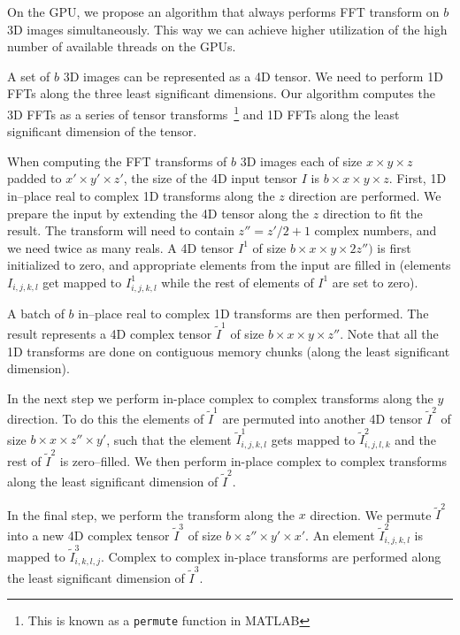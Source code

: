 \documentclass[conference]{IEEEtran}
\begin{document}
  On the GPU, we propose an algorithm that always performs FFT
  transform on $b$ 3D images simultaneously.  This way we can achieve
  higher utilization of the high number of available threads on the
  GPUs.

  A set of $b$ 3D images can be represented as a 4D tensor.  We need
  to perform 1D FFTs along the three least significant dimensions.
  Our algorithm computes the 3D FFTs as a series of tensor
  transforms~\footnote{This is known as a \texttt{permute} function in
    MATLAB} and 1D FFTs along the least significant dimension of the
  tensor.

  When computing the FFT transforms of $b$ 3D images each of size $x
  \times y \times z$ padded to $x' \times y' \times z'$, the size of
  the 4D input tensor $I$ is $b \times x \times y \times z$.  First,
  1D in--place real to complex 1D transforms along the $z$ direction
  are performed. We prepare the input by extending the 4D tensor along
  the $z$ direction to fit the result.  The transform will need to
  contain $z'' = z' / 2 + 1$ complex numbers, and we need twice as
  many reals.  A 4D tensor $I^1$ of size $b \times x \times y \times
  2z'')$ is first initialized to zero, and appropriate elements from
  the input are filled in (elements $I_{i,j,k,l}$ get mapped to
  $I^1_{i,j,k,l}$ while the rest of elements of $I^1$ are set to
  zero).

  A batch of $b$ in--place real to complex 1D transforms are then
  performed.  The result represents a 4D complex tensor
  $\widetilde{I}^1$ of size $b \times x \times y \times z''$.  Note
  that all the 1D transforms are done on contiguous memory chunks
  (along the least significant dimension).

  In the next step we perform in-place complex to complex transforms
  along the $y$ direction.  To do this the elements of
  $\widetilde{I}^1$ are permuted into another 4D tensor
  $\widetilde{I}^2$ of size $b \times x \times z'' \times y'$, such
  that the element $\widetilde{I}^1_{i,j,k,l}$ gets mapped to
  $\widetilde{I}^2_{i,j,l,k}$ and the rest of $\widetilde{I}^2$ is
  zero--filled.  We then perform in-place complex to complex
  transforms along the least significant dimension of
  $\widetilde{I}^2$.

  In the final step, we perform the transform along the $x$ direction.
  We permute $\widetilde{I}^2$ into a new 4D complex tensor
  $\widetilde{I}^3$ of size $b \times z'' \times y' \times x'$.  An
  element $\widetilde{I}^2_{i,j,k,l}$ is mapped to
  $\widetilde{I}^3_{i,k,l,j}$.  Complex to complex in-place transforms
  are performed along the least significant dimension of
  $\widetilde{I}^3$.
\end{document}

